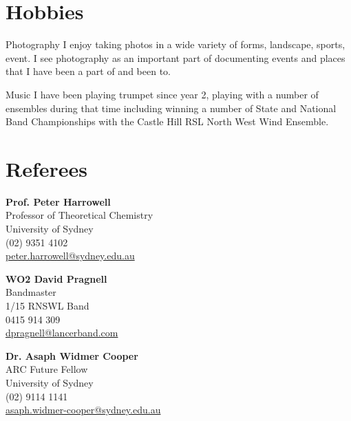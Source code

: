 \documentclass{friggeri-cv} %
\begin{document}

\section{Hobbies}

\begin{entrylist}

\entry
{}
{Photography}
{}
{I enjoy taking photos in a wide variety of forms, landscape, sports, event. I see photography as an important part of documenting events and places that I have been a part of and been to.}

\entry
{}
{Music}
{}
{I have been playing trumpet since year 2, playing with a number of ensembles during that time including winning a number of State and National Band Championships with the Castle Hill RSL North West Wind Ensemble.}

\end{entrylist}

\pagebreak
\section{Referees}
\begin{minipage}[t]{0.5\textwidth}

{\bf Prof. Peter Harrowell}\\
Professor of Theoretical Chemistry\\
University of Sydney\\
(02) 9351 4102\\
\href{mailto:peter.harrowell@sydney.edu.au}{peter.harrowell@sydney.edu.au}
\end{minipage}
\begin{minipage}[t]{0.5\textwidth}
{\bf WO2 David Pragnell}\\
Bandmaster\\
1/15 RNSWL Band\\
0415 914 309\\
\href{mailto:dpragnell@lancerband.com}{dpragnell@lancerband.com}
\end{minipage}
\begin{minipage}[t]{0.5\textwidth}
{\bf Dr. Asaph Widmer Cooper}\\
ARC Future Fellow\\
University of Sydney\\
(02) 9114 1141\\
\href{mailto:asaph.widmer-cooper@sydney.edu.au}{asaph.widmer-cooper@sydney.edu.au}
\end{minipage}
\end{document}

